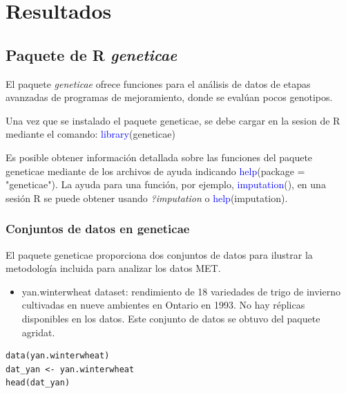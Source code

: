 \chapter{Resultados}
\section{Paquete de R \emph{geneticae}}

El paquete \emph{geneticae} ofrece funciones para el análisis de datos de etapas avanzadas de programas de mejoramiento, donde se evalúan pocos genotipos. 

Una vez que se instalado el paquete geneticae, se debe cargar en la sesion de R mediante el comando: \textcolor{blue}{library}(geneticae)

Es posible obtener información detallada sobre las funciones del paquete geneticae mediante de los archivos de ayuda indicando \textcolor{blue}{help}(package = "geneticae").  La ayuda para una función, por ejemplo, \textcolor{blue}{imputation}(), en una sesión R se puede obtener usando \emph{?imputation} o \textcolor{blue}{help}(imputation).


\subsection{Conjuntos de datos en geneticae}

El paquete geneticae proporciona dos conjuntos de datos para ilustrar la metodología incluida para analizar los datos MET.

\begin{itemize}
\item yan.winterwheat dataset: rendimiento de 18 variedades de trigo de invierno cultivadas en nueve ambientes en Ontario en 1993. No hay réplicas disponibles en los datos. Este conjunto de datos se obtuvo del paquete agridat.
\end{itemize}
\begin{lstlisting}
data(yan.winterwheat)
dat_yan <- yan.winterwheat
head(dat_yan)
\end{lstlisting}

